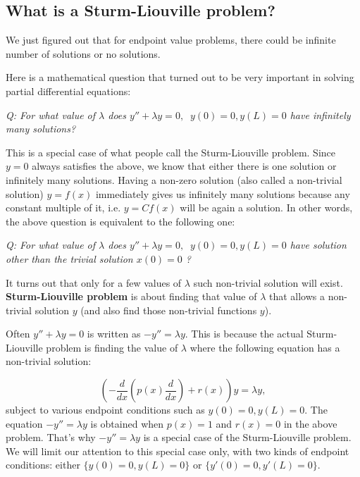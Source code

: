 \documentclass[12pt]{report}
\begin{document}
\subsection*{What is a Sturm-Liouville problem?}
We just figured out that for endpoint value problems, there could be infinite number of solutions or no solutions.

Here is a mathematical question that turned out to be very important in solving partial differential equations:

\vspace{0.5cm}
\textit{Q: For what value of $\lambda$ does $y''+ \lambda y = 0 , \; \; y(0)=0, y(L) =0$ have infinitely many solutions?}

\vspace{0.5cm}

This is a special case of what people call the Sturm-Liouville problem. Since $y=0$ always satisfies the above, we know that either there is one solution or infinitely many solutions. Having a non-zero solution (also called a non-trivial solution) $y=f(x)$ immediately gives us infinitely many solutions because any constant multiple of it, i.e. $y=C f(x)$ will be again a solution. In other words, the above question is equivalent to the following one:

\vspace{0.5cm}
\textit{Q: For what value of $\lambda$ does $y''+ \lambda y = 0 , \; \; y(0)=0, y(L) =0$ have solution other than the trivial solution $x(0)=0$ ?}

\vspace{0.5cm}

 It turns out that only for a few values of $\lambda$ such non-trivial solution will exist. \textbf{Sturm-Liouville problem} is about finding that value of $\lambda$ that allows a non-trivial solution $y$ (and also find those non-trivial functions $y$). 

Often $y''+ \lambda y = 0$ is written as $-y''= \lambda y$. This is because the actual Sturm-Liouville problem is finding the value of $\lambda$ where the following equation has a non-trivial solution:

$$ \left( -\frac{d}{dx} \left(p(x) \frac{d}{dx} \right) + r(x) \right) y = \lambda y , $$
subject to various endpoint conditions such as $y(0)=0, y(L) =0$.
The equation $-y''= \lambda y$ is obtained when $p(x)=1$ and $r(x)=0$ in the above problem. That's why  $-y''= \lambda y$ is a special case of the Sturm-Liouville problem. We will limit our attention to this special case only, with two kinds of endpoint conditions: either $\{y(0)=0, y(L) =0\}$ or $\{y'(0)=0, y'(L) =0\}$.
\end{document}
